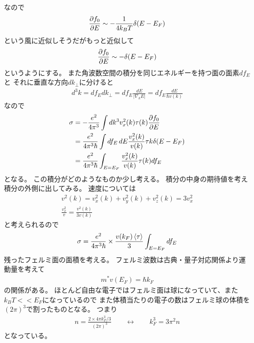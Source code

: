 \documentclass[11pt,dvipdfmx,a4paper]{jsarticle}
\begin{document}
なので
\begin{align}
    \pdv{f_0}{E} \sim -\frac{1}{4k_BT}\delta(E-E_F)
\end{align}
という風に近似しそうだがもっと近似して
\begin{align}
    \pdv{f_0}{E} \sim -\delta(E-E_F) %
\end{align}
というようにする。%
また角波数空間の積分を同じエネルギーを持つ面の面素\(df_E\)と
それに垂直な方向\(dk_{\perp}\)に分けると
\begin{align}
    d^3k =df_Edk_\perp = df_E \frac{dE}{|\nabla_k E|} = df_E \frac{dE}{\hbar v(k)} %
\end{align}
なので
\begin{align}
    \sigma &= -\frac{e^2}{4\pi^3}\int dk^3 v_x^2(k)\tau(k)\pdv{f_0}{E} \\%
    &=\frac{e^2}{4\pi^3\hbar}\int df_E \, dE \frac{v_x^2(k)}{v(k)}\tau{k}\delta(E-E_F) \\%
    &=\frac{e^2}{4\pi^3\hbar}\int_{E=E_F}\frac{v_x^2(k)}{v(k)}\tau(k) df_E \\%
\end{align}
となる。
この積分がどのようなものか少し考える。
積分の中身の期待値を考え積分の外側に出してみる。
速度については
\begin{align}
    v^2(k) = v_x^2(k) + v_y^2(k) + v_z^2(k) = 3 v_x^2\\
    \frac{v_x^2}{v} = \frac{v^2(k)}{3v(k)}
\end{align}
と考えられるので
\begin{align}
    \sigma = \frac{e^2}{4\pi^3\hbar}\times \frac{v(k_F)\ev{\tau}}{3}\int_{E=E_F} df_E
\end{align}
残ったフェルミ面の面積を考える。
フェルミ波数は古典・量子対応関係より運動量を考えて
\begin{align}
    m^*v(E_F) = \hbar k_F %
\end{align}
の関係がある。
ほとんど自由な電子ではフェルミ面は球になっていて、また\(k_BT <<E_F\)になっているので
また体積当たりの電子の数はフェルミ球の体積を\((2\pi)^3\)で割ったものとなる。
つまり
\begin{align}
    n = \frac{2 \times 4 \pi k_F^3/3}{(2\pi)^3} \qquad \leftrightarrow \qquad
    k_F^3 = 3\pi^2n %
\end{align}
となっている。%
\end{document}
